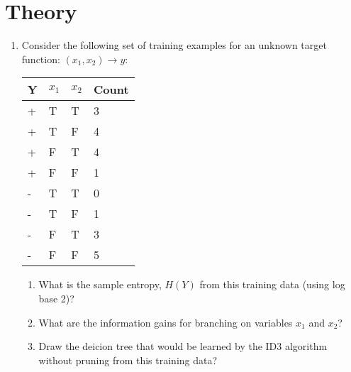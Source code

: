 \documentclass[12pt]{article}
\begin{document}
\maketitle


\newpage
\section{Theory}
\begin{enumerate}
\item Consider the following set of training examples for an unknown target function:  $(x_1, x_2)\rightarrow y$:
\begin{table}[h]
\begin{center}
\begin{tabular}{|l|l|l|l|}
\hline
Y & $x_1$ & $x_2$ & Count\\
\hline
+ & T & T & 3\\
+ & T & F & 4\\
+ & F & T & 4\\
+ & F & F & 1\\
- & T & T & 0\\
- & T & F & 1\\
- & F & T & 3\\
- & F & F & 5\\
\hline
\end{tabular}
\end{center}
\end{table}
	\begin{enumerate}
	\item What is the sample entropy, $H(Y)$ from this training data (using log base 2)?
	\item What are the information gains for branching on variables $x_1$ and $x_2$?
	\item Draw the deicion tree that would be learned by the ID3 algorithm without pruning from this training data?
	\end{enumerate}
	

\end{enumerate}
\end{document}
